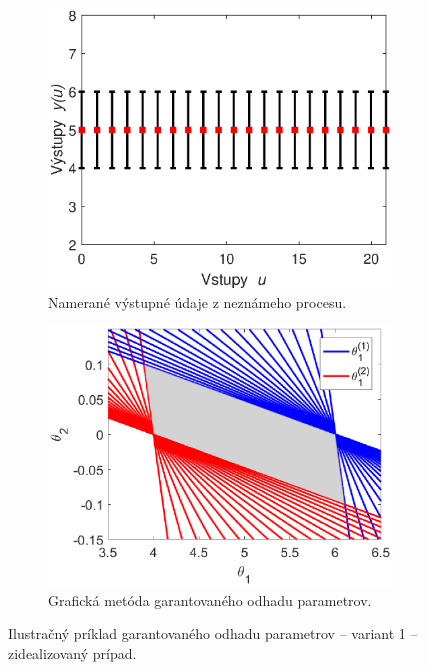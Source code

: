 \begin{figure}
	\centering
	\begin{subfigure}[b]{0.48\textwidth}
		\centering
		\includegraphics[width=\linewidth]{images/gpe_ex_data1}
		\caption{Namerané výstupné údaje z neznámeho procesu.}
		\label{gpe_ex1_data}
	\end{subfigure}
	\begin{subfigure}[b]{0.48\textwidth}
		\centering
		\includegraphics[width=\linewidth]{images/gpe_ex_line1}
		\caption{Grafická metóda garantovaného odhadu parametrov.}
		\label{gpe_ex1_gm}
	\end{subfigure}
	\caption{Ilustračný príklad garantovaného odhadu parametrov -- variant 1 -- zidealizovaný prípad.}
	\label{gpe_ex1}
\end{figure}

